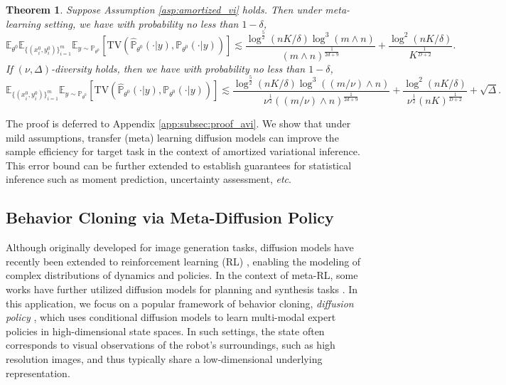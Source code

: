 \documentclass{article}
\numberwithin{equation}{section}
\newcommand{\E}{\mathbb{E}}
\newtheorem{thm}{Theorem}[section]
\theoremstyle{definition}
\renewcommand{\P}{\mathbb{P}}
\begin{document}
\begin{thm}\label{thm:amortized_vi}
    Suppose Assumption \ref{asp:amortized_vi} holds. 
    Then under meta-learning setting, we have with probability no less than $1-\delta$,
    \begin{equation}
        \E_{\theta^0} \E_{\{(x_i^0,y_i^0)\}_{i=1}^m}\E_{y\sim\P_{\theta^0}}[\mathrm{TV}(\widehat{\P}_{\theta^0}(\cdot|y),\P_{\theta^0}(\cdot|y))]\lesssim 
        \frac{\log^{\frac{5}{2}}(nK/\delta)\log^3(m\wedge n)}{(m\wedge n)^{\frac{1}{2d+9}}}+\frac{\log^2(nK/\delta)}{K^{\frac{1}{D+2}}}.
    \end{equation}
    If $(\nu,\Delta)$-diversity holds, then we have with probability no less than $1-\delta$,
    \begin{equation}
        \E_{\{(x_i^0,y_i^0)\}_{i=1}^m}\E_{y\sim\P_{\theta^0}}[\mathrm{TV}(\widehat{\P}_{\theta^0}(\cdot|y),\P_{\theta^0}(\cdot|y))]\lesssim \frac{\log^{\frac{5}{2}}(nK/\delta)\log^3((m/\nu)\wedge n)}{\nu^{\frac{1}{2}}((m/\nu)\wedge n)^{\frac{1}{2d+9}}}+\frac{\log^2(nK/\delta)}{\nu^{\frac{1}{2}}(nK)^{\frac{1}{D+2}}}+\sqrt{\Delta}.
    \end{equation}
\end{thm}

The proof is deferred to Appendix \ref{app:subsec:proof_avi}.
We show that under mild assumptions, transfer (meta) learning diffusion models can improve the sample efficiency for target task in the context of amortized variational inference. 
This error bound can be further extended to establish guarantees for statistical inference such as moment prediction, uncertainty assessment, \textit{etc}.


\subsection{Behavior Cloning via Meta-Diffusion Policy}

Although originally developed for image generation tasks, diffusion models have recently been extended to reinforcement learning (RL) \citep{janner2022planning,chi2023diffusion,wang2022diffusion}, enabling the modeling of complex distributions of dynamics and policies.
In the context of meta-RL, some works have further utilized diffusion models for planning and synthesis tasks \citep{ni2023metadiffuser,he2023diffusion}.  
In this application, we focus on a popular framework of behavior cloning, \textit{diffusion policy} \citep{chi2023diffusion}, which uses conditional diffusion models to learn multi-modal expert policies in high-dimensional state spaces.
In such settings, the state often corresponds to visual observations of the robot's surroundings, such as high resolution images, and thus typically share a low-dimensional underlying representation.
\end{document}
